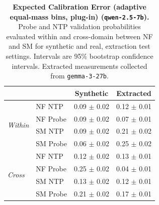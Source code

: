 \begin{table}[ht]
\centering
\begin{tabular}{ll cc}
\toprule
& & Synthetic & Extracted \\
\midrule
\multirow{4}{*}{\textit{Within}}
& NF NTP & 0.09 $\pm$ 0.02 & 0.12 $\pm$ 0.01 \\
& NF Probe & 0.09 $\pm$ 0.02 & 0.07 $\pm$ 0.01 \\
& SM NTP & 0.09 $\pm$ 0.02 & 0.21 $\pm$ 0.02 \\
& SM Probe & 0.06 $\pm$ 0.02 & 0.25 $\pm$ 0.02 \\
\midrule
\multirow{4}{*}{\textit{Cross}}
& NF NTP & 0.12 $\pm$ 0.02 & 0.13 $\pm$ 0.01 \\
& NF Probe & 0.25 $\pm$ 0.02 & 0.04 $\pm$ 0.01 \\
& SM NTP & 0.13 $\pm$ 0.02 & 0.12 $\pm$ 0.01 \\
& SM Probe & 0.21 $\pm$ 0.02 & 0.17 $\pm$ 0.01 \\
\bottomrule
\end{tabular}
\caption{\textbf{Expected Calibration Error (adaptive equal-mass bins, plug-in) (\texttt{qwen-2.5-7b}).} Probe and NTP validation probabilities evaluated within and cross-domain between NF and SM for synthetic and real, extraction test settings. Intervals are 95\% bootstrap confidence intervals. Extracted measurements collected from \texttt{gemma-3-27b}.}
\label{tab:qwen-2.5-7b-gemma-3-27b-nfix_supermat-ece_em}
\end{table}
